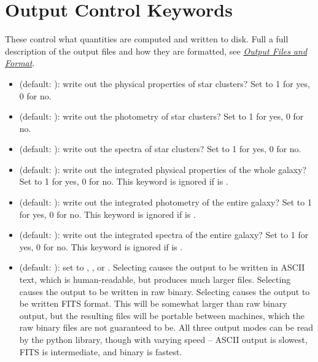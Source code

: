 \documentclass[letterpaper,10pt,english]{sphinxmanual}
\begin{document}
\section{Output Control Keywords}
\label{parameters:output-control-keywords}
These control what quantities are computed and written to disk. Full a full description of the output files and how they are formatted, see {\hyperref[output:sec-output]{\emph{Output Files and Format}}}.
\begin{itemize}
\item {} 
 (default: ): write out the physical properties of star clusters? Set to 1 for yes, 0 for no.

\item {} 
 (default: ): write out the photometry of star clusters? Set to 1 for yes, 0 for no.

\item {} 
 (default: ): write out the spectra of star clusters? Set to 1 for yes, 0 for no.

\item {} 
 (default: ): write out the integrated physical properties of the whole galaxy? Set to 1 for yes, 0 for no. This keyword is ignored if  is .

\item {} 
 (default: ): write out the integrated photometry of the entire galaxy? Set to 1 for yes, 0 for no. This keyword is ignored if  is .

\item {} 
 (default: ): write out the integrated spectra of the entire galaxy? Set to 1 for yes, 0 for no. This keyword is ignored if  is .

\item {} 
 (default: ): set to , , or . Selecting  causes the output to be written in ASCII text, which is human-readable, but produces much larger files. Selecting  causes the output to be written in raw binary. Selecting  causes the output to be written FITS format. This will be somewhat larger than raw binary output, but the resulting files will be portable between machines, which the raw binary files are not guaranteed to be. All three output modes can be read by the python library, though with varying speed -- ASCII output is slowest, FITS is intermediate, and binary is fastest.

\end{itemize}
\end{document}
